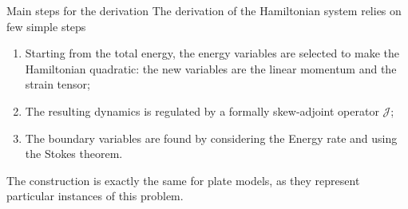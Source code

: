 \documentclass[aspectratio=169]{ISAE-Beamer}
\begin{document}
\begin{frame}{Main steps for the derivation}
The derivation of the Hamiltonian system relies on few simple steps  
\begin{enumerate}
	\item Starting from the total energy, the energy variables are selected to make the Hamiltonian quadratic: the new variables are the linear momentum and the strain tensor;
	\item The resulting dynamics is regulated by a formally skew-adjoint operator $\mathcal{J}$;
	\item The boundary variables are found by considering the Energy rate and using the Stokes theorem.
\end{enumerate}

The construction is exactly the same for plate models, as they represent particular instances of this problem.
\end{frame}
\end{document}
